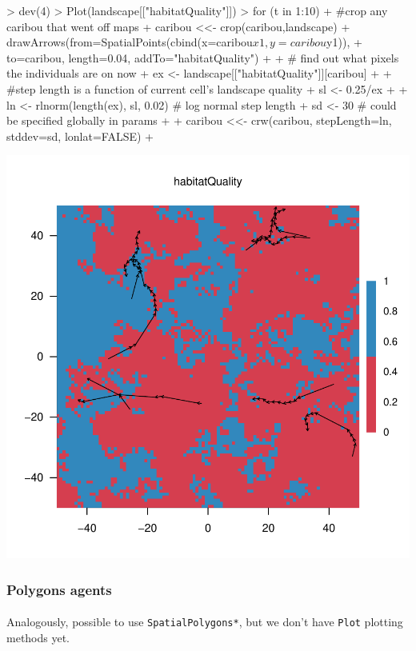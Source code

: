 \documentclass{article}
\begin{document}
\begin{Schunk}
\begin{Sinput}
> dev(4)
> Plot(landscape[["habitatQuality"]])
> for (t in 1:10) {
+   #crop any caribou that went off maps
+   caribou <<- crop(caribou,landscape)
+   drawArrows(from=SpatialPoints(cbind(x=caribou$x1, y=caribou$y1)),
+              to=caribou, length=0.04, addTo="habitatQuality")
+ 
+   # find out what pixels the individuals are on now
+   ex <- landscape[["habitatQuality"]][caribou]
+ 
+   #step length is a function of current cell's landscape quality
+   sl <- 0.25/ex
+ 
+   ln <- rlnorm(length(ex), sl, 0.02) # log normal step length
+   sd <- 30 # could be specified globally in params
+ 
+   caribou <<- crw(caribou, stepLength=ln, stddev=sd, lonlat=FALSE)
+ }
\end{Sinput}
\end{Schunk}
\includegraphics{introduction-agent-crw-trajectory}

\subsubsection{Polygons agents}

\paragraph{}
Analogously, possible to use \texttt{SpatialPolygons*}, but we don't have \texttt{Plot} plotting methods yet.
\end{document}
